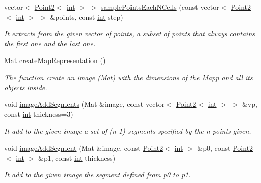 \begin{DoxyCompactItemize}
vector$<$ \mbox{\hyperlink{class_point2}{Point2}}$<$ \mbox{\hyperlink{draw_8hh_aa620a13339ac3a1177c86edc549fda9b}{int}} $>$ $>$ \mbox{\hyperlink{class_mapp_a487a24310b4ee3babffc06a60c5893f3}{sample\+Points\+Each\+N\+Cells}} (const vector$<$ \mbox{\hyperlink{class_point2}{Point2}}$<$ \mbox{\hyperlink{draw_8hh_aa620a13339ac3a1177c86edc549fda9b}{int}} $>$ $>$ \&points, const \mbox{\hyperlink{draw_8hh_aa620a13339ac3a1177c86edc549fda9b}{int}} step)
\begin{DoxyCompactList}\small\item\em It extracts from the given vector of points, a subset of points that always contains the first one and the last one. \end{DoxyCompactList}\item 
Mat \mbox{\hyperlink{class_mapp_ab68b0efc22947a8f78b3436bbfe3330c}{create\+Map\+Representation}} ()
\begin{DoxyCompactList}\small\item\em The function create an image (Mat) with the dimensions of the \mbox{\hyperlink{class_mapp}{Mapp}} and all its objects inside. \end{DoxyCompactList}\item 
void \mbox{\hyperlink{class_mapp_a4c1148c6feadeb789a6bf7c4ac6569e9}{image\+Add\+Segments}} (Mat \&image, const vector$<$ \mbox{\hyperlink{class_point2}{Point2}}$<$ \mbox{\hyperlink{draw_8hh_aa620a13339ac3a1177c86edc549fda9b}{int}} $>$ $>$ \&vp, const \mbox{\hyperlink{draw_8hh_aa620a13339ac3a1177c86edc549fda9b}{int}} thickness=3)
\begin{DoxyCompactList}\small\item\em It add to the given image a set of (n-\/1) segments specified by the n points given. \end{DoxyCompactList}\item 
void \mbox{\hyperlink{class_mapp_ac82b6ba32304e9985365fbabe9a6d046}{image\+Add\+Segment}} (Mat \&image, const \mbox{\hyperlink{class_point2}{Point2}}$<$ \mbox{\hyperlink{draw_8hh_aa620a13339ac3a1177c86edc549fda9b}{int}} $>$ \&p0, const \mbox{\hyperlink{class_point2}{Point2}}$<$ \mbox{\hyperlink{draw_8hh_aa620a13339ac3a1177c86edc549fda9b}{int}} $>$ \&p1, const \mbox{\hyperlink{draw_8hh_aa620a13339ac3a1177c86edc549fda9b}{int}} thickness)
\begin{DoxyCompactList}\small\item\em It add to the given image the segment defined from p0 to p1. \end{DoxyCompactList}\item 

\end{DoxyCompactItemize}
